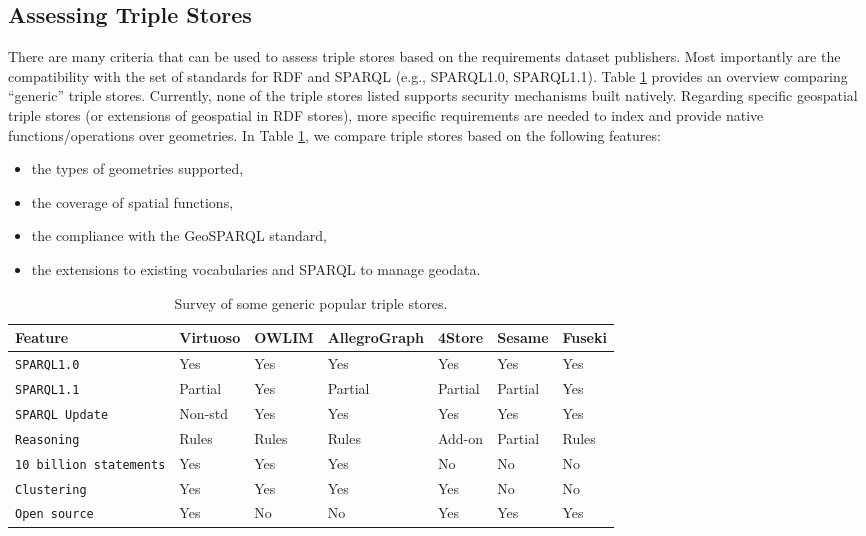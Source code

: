 \subsection{Assessing Triple Stores }
There are many criteria that can be used to assess triple stores based on the requirements dataset publishers. Most importantly are the compatibility with the set of standards for RDF and SPARQL (e.g., SPARQL1.0, SPARQL1.1). Table \ref{tab:generictriples} provides an overview comparing ``generic'' triple stores. Currently, none of the triple stores listed supports security mechanisms built natively. Regarding specific geospatial triple stores (or extensions of geospatial in RDF stores), more specific requirements are needed to index and provide native functions/operations over geometries. In Table \ref{tab:generictriples}, we compare triple stores based on the following features:
\begin{itemize}
\item the types of geometries supported,
\item the coverage of spatial functions,
\item the compliance with the GeoSPARQL standard,
\item the extensions to existing vocabularies and SPARQL to manage geodata.
\end{itemize}

\begin{table}[htb!]
    \caption{Survey of some generic popular triple stores.}
    \label{tab:generictriples}
    \centering
    \begin{tabular}{lllllll}
    \toprule
    \textbf{Feature} & \textbf{Virtuoso} & \textbf{OWLIM} & \textbf{AllegroGraph} & \textbf{4Store} &  \textbf{Sesame} & \textbf{Fuseki} \\
    \toprule
    \texttt{SPARQL1.0} & Yes & Yes & Yes & Yes & Yes & Yes \\
    \midrule
    \texttt{SPARQL1.1} & Partial & Yes & Partial & Partial & Partial & Yes \\
    \midrule
    \texttt{SPARQL Update} & Non-std & Yes & Yes & Yes & Yes & Yes \\
    \midrule
    \texttt{Reasoning} & Rules & Rules & Rules & Add-on & Partial & Rules \\
    \midrule
    \texttt{10 billion statements} & Yes & Yes & Yes & No & No & No \\
    \midrule
    \texttt{Clustering} & Yes & Yes & Yes & Yes & No & No \\
    \midrule
    \texttt{Open source} & Yes & No & No & Yes & Yes & Yes \\
    \bottomrule
    \end{tabular}
\end{table}

